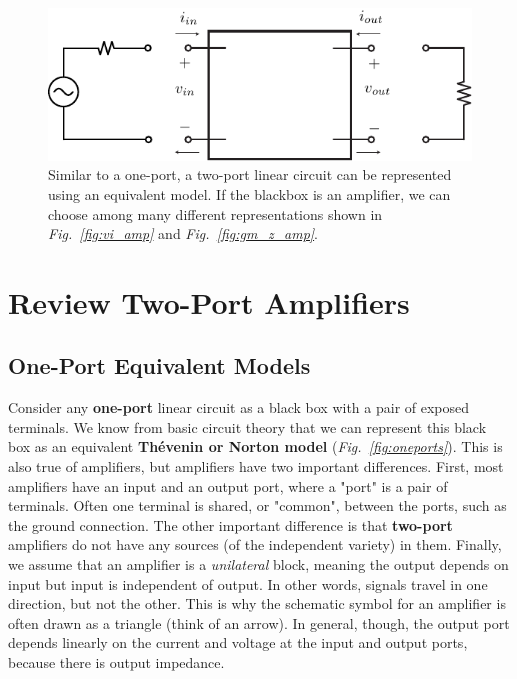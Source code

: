 \begin{figure}[H]
\centering
\includegraphics[scale=1.05]{2port_ss}
\caption{Similar to a one-port, a two-port linear circuit can be represented using an equivalent model.  If the blackbox is an amplifier, we can choose among many different representations shown in \emph{Fig.~\ref{fig:vi_amp}} and \emph{Fig.~\ref{fig:gm_z_amp}}.}
\label{fig:2port_ss}
\end{figure}
\section{Review Two-Port Amplifiers}
\subsection{One-Port Equivalent Models}
Consider any \textbf{one-port} linear circuit as a black box with a pair of exposed terminals.  We know from basic circuit theory that we can represent this black box as an equivalent \textbf{Thévenin or Norton model} (\emph{Fig.~\ref{fig:oneports}}).  This is also true of amplifiers, but amplifiers have two important differences.  First, most amplifiers have an input and an output port, where a "port" is a  pair of terminals.  Often one terminal is shared, or "common", between the ports, such as the ground connection.  The other important difference is that \textbf{two-port} amplifiers do not have any sources (of the independent variety) in them.  Finally, we assume that an amplifier is a \textit{unilateral} block, meaning the output depends on input but input is independent of output.  In other words, signals travel in one direction, but not the other.  This is why the schematic symbol for an amplifier is often drawn as a triangle (think of an arrow).  In general, though, the output port depends linearly on the current and voltage at the input and output ports, because there is output impedance.  

